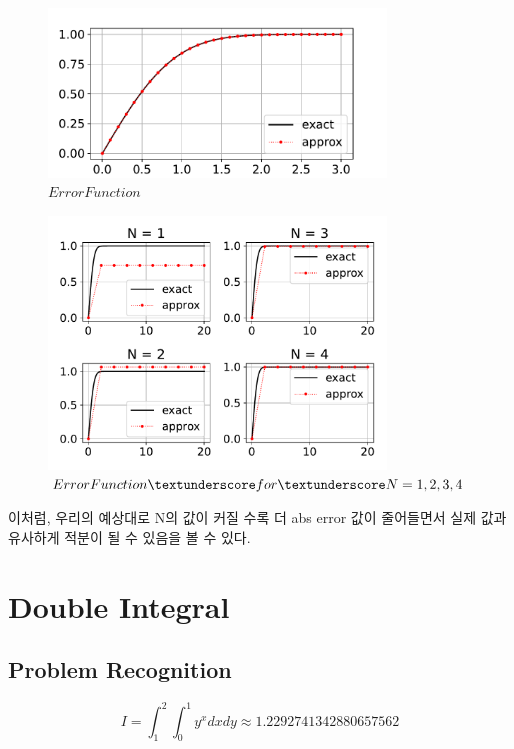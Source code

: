 \documentclass[11pt]{article}
\begin{document}
\begin{figure}[!ht]
  \centering
  \includegraphics[width=0.8\textwidth]{Error_Funcion.pdf}
  \caption{$Error Function$ }
\end{figure}
\begin{figure}[!ht]

  \centering
  \includegraphics[width=0.8\textwidth]{Error_Funcion1.pdf}
  \caption{$Error Function\textunderscore for\textunderscore N = 1, 2, 3, 4$ }
\end{figure}

이처럼, 우리의 예상대로 N의 값이 커질 수록 더 abs error 값이 줄어들면서 실제 값과 유사하게 적분이 될 수 있음을 볼 수 있다.
\pagebreak












\section{Double Integral}
\subsection{Problem Recognition} 
\begin{equation}
I = \int_{1}^{2} \int_{0}^{1} y^x dx dy
\approx 1.2292741342880657562
\end{equation}
\end{document}

